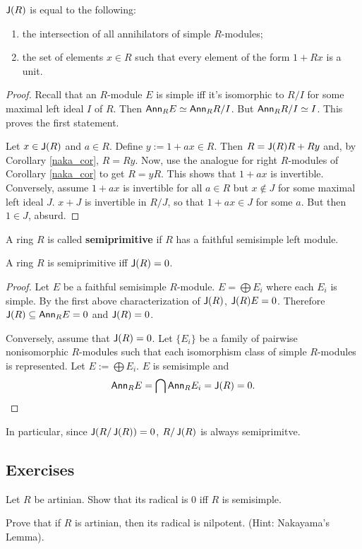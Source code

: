 \begin{thm}
$\operatorname{\sf{J}}(R)$ is equal to the following: 
\begin{enumerate}
    \item the intersection of all annihilators of simple $R$-modules; 
    \item  the set of elements $x \in R$ such that every element of the form $1 + Rx$ is a unit.
\end{enumerate}
\begin{proof}
Recall that an $R$-module $E$ is simple iff it's isomorphic to $R/I$ for some maximal left ideal $I$ of $R$. 
Then $\textsf{Ann}_R E \simeq \textsf{Ann}_R R/I$.  
But $\textsf{Ann}_R R/I \simeq I$. 
This proves the first statement. 

Let $x \in \operatorname{\sf{J}}(R)$ and $a \in R$. 
Define $y:=1+ax \in R$. 
Then $R=\operatorname{\sf{J}}(R)R+Ry$ and, by Corollary \ref{naka_cor}, $R=Ry$. Now, use the analogue for right $R$-modules of Corollary \ref{naka_cor} to get $R=yR$. 
This shows that $1+ax$ is invertible. 
Conversely, assume $1+ax$ is invertible for all $a \in R$ but $x \notin J$ for some maximal left ideal $J$. 
$x+J$ is invertible in $R/J$, so that $1+ax \in J$ for some $a$. 
But then $1 \in J$, absurd. 
\end{proof}
\end{thm}

A ring $R$ is called \textbf{semiprimitive} if $R$ has a faithful semisimple left module. 

\begin{thm} A ring $R$ is semiprimitive iff $\operatorname{\sf{J}}(R)=0$.
\begin{proof}
Let $E$ be a faithful semisimple $R$-module. $E=\bigoplus E_i$ where each $E_i$ is simple. 
By the first above characterization of $\operatorname{\sf{J}}(R)$, $\operatorname{\sf{J}}(R)E=0$. 
Therefore $\operatorname{\sf{J}}(R) \subseteq \textsf{Ann}_R E =0$ and $\operatorname{\sf{J}}(R)=0$. 

Conversely, assume that $\operatorname{\sf{J}}(R)=0$. Let $\{E_i\}$ be a family of pairwise nonisomorphic $R$-modules such that each isomorphism class of simple $R$-modules is represented. 
Let $E:=\bigoplus E_i$. 
$E$ is semisimple and 
$$\textsf{Ann}_R E = \bigcap \textsf{Ann}_R E_i =\operatorname{\sf{J}}(R)=0\text{.}$$ 
\end{proof}
\end{thm}

In particular, since $\operatorname{\sf{J}}(R/\operatorname{\sf{J}}(R))=0$, $R/\operatorname{\sf{J}}(R)$ is always semiprimitve. 

\subsection*{Exercises} 
\begin{ex} \label{radicalzero} Let $R$ be artinian. Show that its radical is $0$ iff $R$ is semisimple.
\end{ex}

\begin{ex} \label{nilpotent} Prove that if $R$ is artinian, then its radical is nilpotent. (Hint: Nakayama's Lemma). 
\end{ex} 
